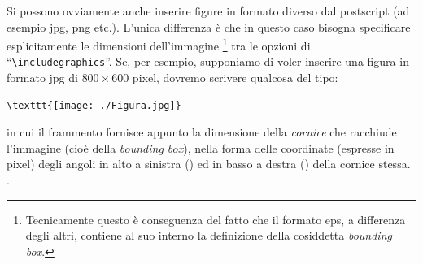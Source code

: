 Si possono ovviamente anche inserire figure in formato diverso dal
postscript (ad esempio jpg, png etc.). L'unica differenza \`e che in questo
caso bisogna specificare esplicitamente le dimensioni dell'immagine%
\footnote{
Tecnicamente questo \`e conseguenza del fatto che il formato eps, a differenza
degli altri, contiene al suo interno la definizione della cosiddetta
\emph{bounding box}.
}
tra le opzioni di ``\verb|\includegraphics|''.
Se, per esempio, supponiamo di voler inserire una figura in formato jpg
di $800\times 600$ pixel, dovremo scrivere qualcosa del tipo:
\begin{verbatim}
\texttt{[image: ./Figura.jpg]}
\end{verbatim}
in cui il frammento 
fornisce appunto la dimensione della \emph{cornice} che racchiude l'immagine
(cio\`e della \emph{bounding box}), nella forma delle coordinate (espresse in
pixel) degli angoli in alto a sinistra () ed in basso a destra
() della cornice stessa.
.
